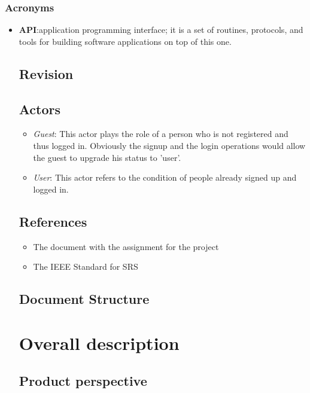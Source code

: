 \documentclass{article}
\begin{document}
\subsubsection{Acronyms}
\begin{itemize}
	\item \textbf{API}:\@ application programming interface; it is a set of routines, protocols, and tools for building software applications on top of this one.
	
\subsection{Revision}



\subsection{Actors}
\begin{itemize}
	\item \textit{Guest}: This actor plays the role of a person who is not registered and thus logged in. Obviously the signup and the login operations would allow the guest to upgrade his status to 'user'.
	\item \textit{User}: This actor refers to the condition of people already signed up and logged in. 

\end{itemize}

\subsection{References}
\begin{itemize}
	\item The document with the assignment for the project
	\item The IEEE Standard for SRS 
\end{itemize}
\subsection{Document Structure}


\clearpage
\section{Overall description}

\subsection{Product perspective}




\end{itemize}
\end{document}

